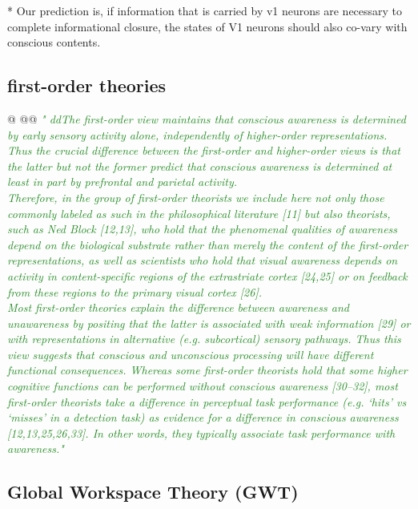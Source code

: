 \documentclass[utf8]{article}
\newenvironment{ants}
			{
			 \begin{easylist}[itemize]
			}
			{
			\end{easylist}
			}
\newcommand{\rewrite}[1]{\textcolor{ForestGreen}{\textit{"#1"}}\newline}
\begin{document}
				* Our prediction is, if information that is carried by v1 neurons are necessary to complete informational closure, the states of V1 neurons should also co-vary with conscious contents. 	
				
		\subsection{first-order theories}
			\begin{ants}
				@\cite{lau2011empirical}
					@@ \rewrite{
						ddThe ﬁrst-order view maintains that conscious awareness is determined by early sensory activity alone, independently of higher-order representations. Thus the crucial difference between the ﬁrst-order and higher-order views is that the latter but not the former predict that conscious awareness is determined at least in part by prefrontal and parietal activity.\\
						Therefore, in the group of ﬁrst-order theorists we include here not only those commonly labeled as such in the philosophical literature [11] but also theorists, such as Ned Block [12,13], who hold that the phenomenal qualities of awareness depend on the biological substrate rather than merely the content of the ﬁrst-order representations, as well as scientists who hold that visual awareness depends on activity in content-speciﬁc regions of the extrastriate cortex [24,25] or on feedback from these regions to the primary visual cortex [26].\\
						Most ﬁrst-order theories explain the difference between awareness and unawareness by positing that the latter is associated with weak information [29] or with representations in alternative (e.g. subcortical) sensory pathways. Thus this view suggests that conscious and unconscious processing will have different functional consequences. Whereas some ﬁrst-order theorists hold that some higher cognitive functions can be performed without conscious awareness [30–32], most ﬁrst-order theorists take a difference in perceptual task performance (e.g. ‘hits’ vs ‘misses’ in a detection task) as evidence for a difference in conscious awareness [12,13,25,26,33]. In other words, they typically associate task performance with awareness.}
				
			\end{ants}
		
		
		\subsection{Global Workspace Theory (GWT)}
\end{document}
